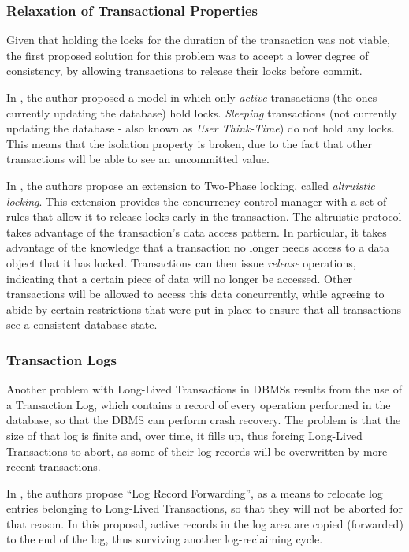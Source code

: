 \documentclass{llncs}
\begin{document}
\subsubsection{Relaxation of Transactional Properties}

Given that holding the locks for the duration of the transaction was
not viable, the first proposed solution for this problem was to accept
a lower degree of consistency, by allowing transactions to release
their locks before commit.

In \cite{gray1981transaction}, the author proposed a model in which
only {\it active} transactions (the ones currently updating the
database) hold locks. {\it Sleeping} transactions (not currently
updating the database - also known as {\it User Think-Time}) do not
hold any locks. This means that the isolation property is broken, due
to the fact that other transactions will be able to see an uncommitted
value.

In \cite{salem1989altruistic}, the authors propose an extension to
Two-Phase locking, called {\it altruistic locking}. This extension
provides the concurrency control manager with a set of rules that
allow it to release locks early in the transaction. The altruistic
protocol takes advantage of the transaction's data access pattern. In
particular, it takes advantage of the knowledge that a transaction no
longer needs access to a data object that it has locked. Transactions
can then issue {\it release} operations, indicating that a certain
piece of data will no longer be accessed. Other transactions will be
allowed to access this data concurrently, while agreeing to abide by
certain restrictions that were put in place to ensure that all
transactions see a consistent database state.

\subsubsection{Transaction Logs}

Another problem with Long-Lived Transactions in DBMSs results from the
use of a Transaction Log, which contains a record of every operation
performed in the database, so that the DBMS can perform crash
recovery. The problem is that the size of that log is finite and, over
time, it fills up, thus forcing Long-Lived Transactions to abort, as
some of their log records will be overwritten by more recent
transactions.

In \cite{hagmann1991implementing}, the authors propose ``Log Record
Forwarding'', as a means to relocate log entries belonging to
Long-Lived Transactions, so that they will not be aborted for that
reason. In this proposal, active records in the log area are copied
(forwarded) to the end of the log, thus surviving another
log-reclaiming cycle.
\end{document}
